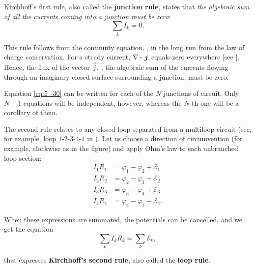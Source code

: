 Kirchhoff's first rule, also called the \textbf{junction rule}, states that \textit{the algebraic sum of all the currents coming into a junction must be zero}:
\begin{equation}\label{eq:5_30}
    \sum_k I_k = 0.
\end{equation}

\noindent
This rule follows from the continuity equation, \ie, in the long run from the law of charge conservation. For a steady current, $\nabla\boldsymbol{\cdot}\,\boldsymbol{j}$ equals zero everywhere [see ]. Hence, the flux of the vector $\vec{j}$, \ie, the algebraic sum of the currents flowing through an imaginary closed surface surrounding a junction, must be zero.

Equation \eqref{eq:5_30} can be written for each of the $N$ junctions of circuit. Only $N-1$ equations will be independent, however, whereas the $N$-th one will be a corollary of them.

The second rule relates to any closed loop separated from a multiloop circuit (see, for example, loop $1$-$2$-$3$-$4$-$1$ in ). Let us choose a direction of circumvention (for example, clockwise as in the figure) and apply Ohm's law to each unbranched loop section:
\begin{align*}
    I_1 R_1 &= \varphi_1 - \varphi_2 + \mathcal{E}_1\\
    I_2 R_2 &= \varphi_2 - \varphi_3 + \mathcal{E}_2\\
    I_3 R_3 &= \varphi_3 - \varphi_4 + \mathcal{E}_3\\
    I_4 R_4 &= \varphi_4 - \varphi_1 + \mathcal{E}_4.
\end{align*}

\noindent
When these expressions are summated, the potentials can be cancelled, and we get the equation
\begin{equation}\label{eq:5_31}
    \sum_k I_k R_k = \sum_k \mathcal{E}_k,
\end{equation}

\noindent
that expresses \textbf{Kirchhoff's second rule}, also called the \textbf{loop rule}.


